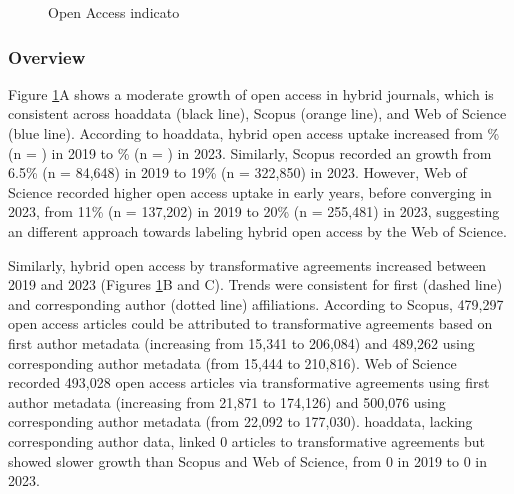 \documentclass[a4paper,man,floatsintext,longtable,noextraspace,10pt]{apa6}
\begin{document}
\begin{figure}[ht!]


\caption{\label{fig-uptake_overview}Open Access indicato}

\end{figure}%

\subsubsection{Overview}\label{overview-1}

Figure \ref{fig-uptake_overview}A shows a moderate growth of open access
in hybrid journals, which is consistent across hoaddata (black line),
Scopus (orange line), and Web of Science (blue line). According to
hoaddata, hybrid open access uptake increased from \% (n = ) in 2019 to
\% (n = ) in 2023. Similarly, Scopus recorded an growth from 6.5\% (n =
84,648) in 2019 to 19\% (n = 322,850) in 2023. However, Web of Science
recorded higher open access uptake in early years, before converging in
2023, from 11\% (n = 137,202) in 2019 to 20\% (n = 255,481) in 2023,
suggesting an different approach towards labeling hybrid open access by
the Web of Science.

Similarly, hybrid open access by transformative agreements increased
between 2019 and 2023 (Figures \ref{fig-uptake_overview}B and C). Trends
were consistent for first (dashed line) and corresponding author (dotted
line) affiliations. According to Scopus, 479,297 open access articles
could be attributed to transformative agreements based on first author
metadata (increasing from 15,341 to 206,084) and 489,262 using
corresponding author metadata (from 15,444 to 210,816). Web of Science
recorded 493,028 open access articles via transformative agreements
using first author metadata (increasing from 21,871 to 174,126) and
500,076 using corresponding author metadata (from 22,092 to 177,030).
hoaddata, lacking corresponding author data, linked 0 articles to
transformative agreements but showed slower growth than Scopus and Web
of Science, from 0 in 2019 to 0 in 2023.
\end{document}
